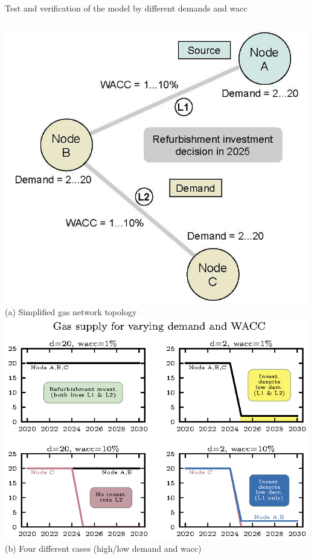 \documentclass[aspectratio=169]{beamer}
\begin{document}
\begin{frame}{Test and verification of the model by different demands and wacc}
	\begin{columns}[T] 	
		\vspace{0.3cm}
		\includegraphics[scale=0.6]{FigA}\\
		\vspace{0.2cm}
		\hspace{1.5cm}\tiny (a) Simplified gas network topology
		\vspace{-0.1cm}
		\includegraphics[scale=0.9]{results.eps}\\
		\vspace{0.2cm}
		\hspace{1.5cm}\tiny (b) Four different cases (high/low demand and wacc)
	\end{columns} 
\end{frame}
\end{document}
